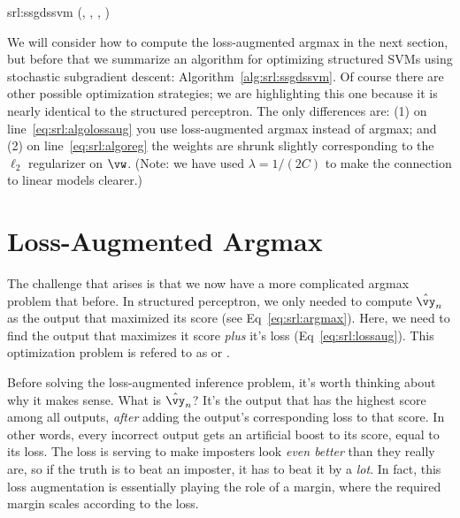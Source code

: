 \newalgorithm%
  {srl:ssgdssvm}%
  {(, , \VARm{\lambda}, \VARm{\ell})}
  {
        \SETST{$\hat \vy$}{$\argmax_{\VARm{\hat\vy} \in \cY(\VARm{\vx})} \dotp{\VARm{\vw}}{\phi(\VARm{\vx},\VARm{\hat\vy})} + \VARm{\ell}(\VARm{\vy}, \VARm{\hat\vy})$} \label{eq:srl:algolossaug}
        \IF{\VAR{$\hat \vy$} $\neq$ \VAR{$\vy$}}
          \SETST{$\vw$}{$\VARm{\vw} + \phi(\VARm{\vx}, \VARm{\vy}) - \phi(\VARm{\vx}, \VARm{\hat \vy})$}
        \ENDIF
         \label{eq:srl:algoreg}
      \ENDFOR
    \ENDFOR
    \RETURN \VAR{$\vw$}
  }


We will consider how to compute the loss-augmented argmax in the next section,
but before that we summarize an algorithm for optimizing structured SVMs using stochastic subgradient descent: Algorithm~\ref{alg:srl:ssgdssvm}. Of course there are other possible optimization strategies; we are highlighting this one because it is nearly identical to the structured perceptron.
The only differences are: (1) on line~\ref{eq:srl:algolossaug} you use loss-augmented argmax instead of argmax; and (2) on line~\ref{eq:srl:algoreg} the weights are shrunk slightly corresponding to the $\ell_2$ regularizer on $\vw$. (Note: we have used $\lambda = 1/(2C)$ to make the connection to linear models clearer.)


\section{Loss-Augmented Argmax}

The challenge that arises is that we now have a more complicated argmax problem that before.
In structured perceptron, we only needed to compute $\hat\vy_n$ as the output that maximized its score (see Eq~\ref{eq:srl:argmax}).
Here, we need to find the output that maximizes it score \emph{plus} it's loss (Eq~\eqref{eq:srl:lossaug}).
This optimization problem is refered to as  or .

Before solving the loss-augmented inference problem, it's worth thinking about why it makes sense.
What is $\hat\vy_n$?
It's the output that has the highest score among all outputs, \emph{after} adding the output's corresponding loss to that score.
In other words, every incorrect output gets an artificial boost to its score, equal to its loss.
The loss is serving to make imposters look \emph{even better} than they really are, so if the truth is to beat an imposter, it has to beat it by a \emph{lot}.
In fact, this loss augmentation is essentially playing the role of a margin, where the required margin scales according to the loss.

